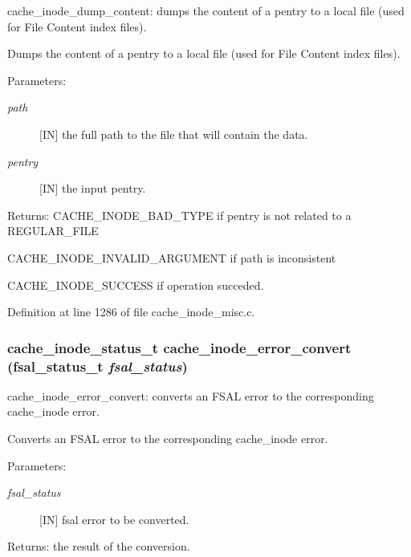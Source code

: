 cache\_\-inode\_\-dump\_\-content: dumps the content of a pentry to a local file (used for File Content index files).

Dumps the content of a pentry to a local file (used for File Content index files).

\begin{Desc}
\item[Parameters:]
\begin{description}
\item[{\em path}][IN] the full path to the file that will contain the data. \item[{\em pentry}][IN] the input pentry.\end{description}
\end{Desc}
\begin{Desc}
\item[Returns:]CACHE\_\-INODE\_\-BAD\_\-TYPE if pentry is not related to a REGULAR\_\-FILE \par
 

CACHE\_\-INODE\_\-INVALID\_\-ARGUMENT if path is inconsistent \par
 

CACHE\_\-INODE\_\-SUCCESS if operation succeded. \end{Desc}


Definition at line 1286 of file cache\_\-inode\_\-misc.c.
\subsubsection[{cache\_\-inode\_\-error\_\-convert}]{\setlength{\rightskip}{0pt plus 5cm}cache\_\-inode\_\-status\_\-t cache\_\-inode\_\-error\_\-convert (fsal\_\-status\_\-t {\em fsal\_\-status})}\label{cache__inode__misc_8c_aa50487b9b403fd85b4a845de1a3df69}


cache\_\-inode\_\-error\_\-convert: converts an FSAL error to the corresponding cache\_\-inode error.

Converts an FSAL error to the corresponding cache\_\-inode error.

\begin{Desc}
\item[Parameters:]
\begin{description}
\item[{\em fsal\_\-status}][IN] fsal error to be converted.\end{description}
\end{Desc}
\begin{Desc}
\item[Returns:]the result of the conversion. \end{Desc}


